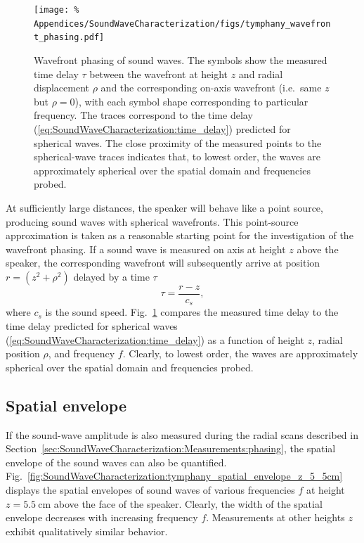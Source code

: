\begin{figure}
  \centering
  \texttt{[image: \%
    Appendices/SoundWaveCharacterization/figs/tymphany\_wavefront\_phasing.pdf]}
  \caption[Wavefront phasing of sound waves]{%
    Wavefront phasing of sound waves.
    The symbols show the measured time delay $\tau$
    between the wavefront at height $z$ and radial displacement $\rho$ and
    the corresponding on-axis wavefront (i.e.\ same $z$ but $\rho = 0$),
    with each symbol shape corresponding to particular frequency.
    The traces correspond to the time delay
    (\ref{eq:SoundWaveCharacterization:time_delay})
    predicted for spherical waves.
    The close proximity of the measured points to the spherical-wave traces
    indicates that, to lowest order, the waves are approximately spherical
    over the spatial domain and frequencies probed.
  }
\label{fig:SoundWaveCharacterization:tymphany_wavefront_phasing}
\end{figure}

At sufficiently large distances,
the speaker will behave like a point source,
producing sound waves with spherical wavefronts.
This point-source approximation is taken as a reasonable
starting point for the investigation of the wavefront phasing.
If a sound wave is measured on axis at height $z$ above the speaker,
the corresponding wavefront will subsequently arrive
at position $r = (z^2 + \rho^2)$
delayed by a time $\tau$
\begin{equation}
  \tau = \frac{r - z}{c_s},
  \label{eq:SoundWaveCharacterization:time_delay}
\end{equation}
where $c_s$ is the sound speed.
Fig.~\ref{fig:SoundWaveCharacterization:tymphany_wavefront_phasing}
compares the measured time delay to
the time delay predicted for spherical waves
(\ref{eq:SoundWaveCharacterization:time_delay})
as a function of height $z$, radial position $\rho$, and frequency $f$.
Clearly, to lowest order, the waves are approximately spherical
over the spatial domain and frequencies probed.


\subsection{Spatial envelope}
\label{sec:SoundWaveCharacterization:Measurements:envelope}
If the sound-wave amplitude is also measured
during the radial scans described in
Section~\ref{sec:SoundWaveCharacterization:Measurements:phasing},
the spatial envelope of the sound waves can also be quantified.
Fig.~\ref{fig:SoundWaveCharacterization:tymphany_spatial_envelope_z_5_5cm}
displays the spatial envelopes of sound waves of various frequencies $f$
at height $z = \SI{5.5}{\centi\meter}$ above the face of the speaker.
Clearly, the width of the spatial envelope decreases
with increasing frequency $f$.
Measurements at other heights $z$
exhibit qualitatively similar behavior.

